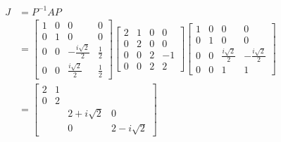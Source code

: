 \begin{align*}
    J &= P^{-1}AP\\ &= \begin{bmatrix}
        1&0&0&0\\
        0&1&0&0\\
        0&0&-\frac{i\sqrt{2}}{2} & \frac{1}{2}\\
        0&0&\frac{i\sqrt{2}}{2}&\frac{1}{2}
        \end{bmatrix}
        \begin{bmatrix}
            2&1&0&0 \\ 0&2&0&0 \\ 0&0&2&-1 \\ 0&0&2&2
        \end{bmatrix}
    \begin{bmatrix}
        1&0&0&0\\
        0&1&0&0\\
        0&0&\frac{i\sqrt{2}}{2} & - \frac{i\sqrt{2}}{2} \\
        0&0&1&1
        \end{bmatrix}\\
    &= \begin{bmatrix}
        2&1&&\\
        0&2&&\\
        &&2+i\sqrt{2}&0\\
        &&0&2-i\sqrt{2}
    \end{bmatrix}
\end{align*}
